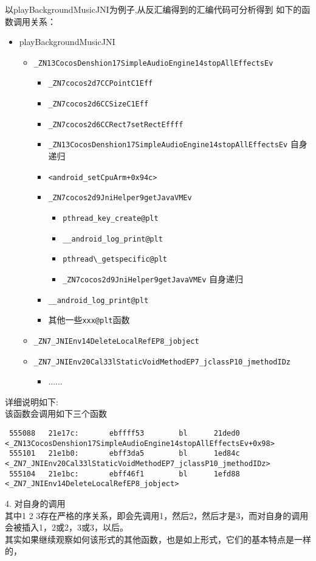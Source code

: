 以playBackgroundMusicJNI为例子,从反汇编得到的汇编代码可分析得到
如下的函数调用关系：
\begin{itemize}
\item playBackgroundMusicJNI
  	\begin{itemize}
  	\item \verb|_ZN13CocosDenshion17SimpleAudioEngine14stopAllEffectsEv|
		\begin{itemize}
  		\item \verb|_ZN7cocos2d7CCPointC1Eff|
   		\item \verb|_ZN7cocos2d6CCSizeC1Eff|
   		\item \verb|_ZN7cocos2d6CCRect7setRectEffff|
  		\item \verb|_ZN13CocosDenshion17SimpleAudioEngine14stopAllEffectsEv| 
		自身递归
		\item \verb|<android_setCpuArm+0x94c>|
		\item \verb|_ZN7cocos2d9JniHelper9getJavaVMEv|
  			\begin{itemize}
 			\item \verb|pthread_key_create@plt|
  			\item \verb|__android_log_print@plt|
  			\item \verb|pthread\_getspecific@plt|
  			\item \verb|_ZN7cocos2d9JniHelper9getJavaVMEv| 自身递归
  			\end{itemize}
		\item \verb|__android_log_print@plt|
		\item 其他一些\verb|xxx@plt|函数
		\end{itemize}
   	\item \verb|_ZN7_JNIEnv14DeleteLocalRefEP8_jobject|
   	\item \verb|_ZN7_JNIEnv20Cal33lStaticVoidMethodEP7_jclassP10_jmethodIDz|
  		\begin{itemize}
  		\item ......
  		\end{itemize}
	\end{itemize}
\end{itemize}
详细说明如下:\\
该函数会调用如下三个函数\\
\begin{lstlisting}
 555088   21e17c:       ebffff53        bl      21ded0 <_ZN13CocosDenshion17SimpleAudioEngine14stopAllEffectsEv+0x98>
 555101   21e1b0:       ebff3da5        bl      1ed84c <_ZN7_JNIEnv20Cal33lStaticVoidMethodEP7_jclassP10_jmethodIDz>
 555104   21e1bc:       ebff46f1        bl      1efd88 <_ZN7_JNIEnv14DeleteLocalRefEP8_jobject>
\end{lstlisting}
 4.  对自身的调用\\
其中1 2 3存在严格的序关系，即会先调用1，然后2，然后才是3，而对自身的调用会被插入1，2或2，3或3，以后。\\
其实如果继续观察如何该形式的其他函数，也是如上形式，它们的基本特点是一样的，\\


